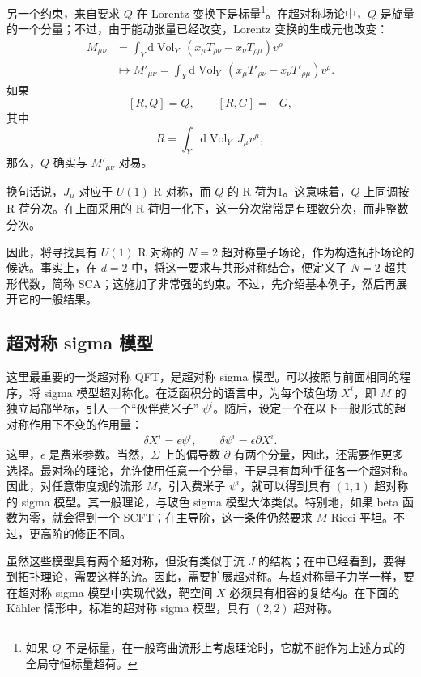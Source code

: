 另一个约束，来自要求 $Q$ 在 Lorentz 变换下是标量\footnote{如果 $Q$ 不是标量，在一般弯曲流形上考虑理论时，它就不能作为上述方式的全局守恒标量超荷。}。在超对称场论中，$Q$ 是旋量的一个分量；不过，由于能动张量已经改变，Lorentz 变换的生成元也改变：
\[
\begin{aligned}
M_{\mu\nu}
&=\int_Y\mathrm{d}\operatorname{Vol}_Y\,
(x_\mu T_{\rho\nu}-x_\nu T_{\rho\mu})v^\rho\\
&\longmapsto
M'_{\mu\nu}=\int_Y\mathrm{d}\operatorname{Vol}_Y\,
(x_\mu T'_{\rho\nu}-x_\nu T'_{\rho\mu})v^\rho.
\end{aligned}
\]
如果
\[
[R,Q]=Q,\qquad[R,G]=-G,
\]
其中
\[
R=\int_Y\mathrm{d}\operatorname{Vol}_Y\,J_\mu v^\mu,
\]
那么，$Q$ 确实与 $M'_{\mu\nu}$ 对易。

换句话说，$J_\mu$ 对应于 $U(1)$ R 对称，而 $Q$ 的 R 荷为1。这意味着，$Q$ 上同调按 R 荷分次。在上面采用的 R 荷归一化下，这一分次常常是有理数分次，而非整数分次。

因此，将寻找具有 $U(1)$ R 对称的 $N=2$ 超对称量子场论，作为构造拓扑场论的候选。事实上，在 $d=2$ 中，将这一要求与共形对称结合，便定义了 $N=2$ 超共形代数，简称 SCA；这施加了非常强的约束。不过，先介绍基本例子，然后再展开它的一般结果。

\subsection{超对称 sigma 模型}\label{sec:3.3.2}

这里最重要的一类超对称 QFT，是超对称 sigma 模型。可以按照与前面相同的程序，将 sigma 模型超对称化。在泛函积分的语言中，为每个玻色场 $X^i$，即 $M$ 的独立局部坐标，引入一个“伙伴费米子” $\psi^i$。随后，设定一个在以下一般形式的超对称作用下不变的作用量：
\begin{equation}\label{eq:3.84}
\delta X^i=\epsilon\psi^i,\qquad
\delta\psi^i=\epsilon\partial X^i.
\end{equation}
这里，$\epsilon$ 是费米参数。当然，$\Sigma$ 上的偏导数 $\partial$ 有两个分量，因此，还需要作更多选择。最对称的理论，允许使用任意一个分量，于是具有每种手征各一个超对称。因此，对任意带度规的流形 $M$，引入费米子 $\psi^i$，就可以得到具有 $(1,1)$ 超对称的 sigma 模型。其一般理论，与玻色 sigma 模型大体类似。特别地，如果 beta 函数为零，就会得到一个 SCFT；在主导阶，这一条件仍然要求 $M$ Ricci 平坦。不过，更高阶的修正不同。

虽然这些模型具有两个超对称，但没有类似于流 $J$ 的结构；在中已经看到，要得到拓扑理论，需要这样的流。因此，需要扩展超对称。与超对称量子力学一样，要在超对称 sigma 模型中实现代数，靶空间 $X$ 必须具有相容的复结构。在下面的 K\"ahler 情形中，标准的超对称 sigma 模型，具有 $(2,2)$ 超对称。

